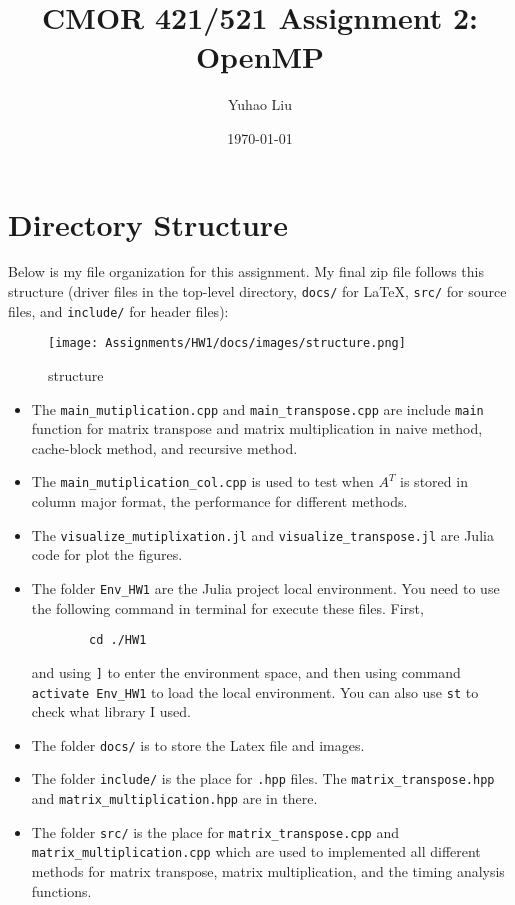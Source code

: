 \documentclass[11pt]{article}
\title{CMOR 421/521 Assignment 2: OpenMP}
\author{Yuhao Liu}
\date{\today}
\begin{document}
\maketitle

\tableofcontents
\bigskip

\newpage

\section{Directory Structure}
Below is my file organization for this assignment. 
My final zip file follows this structure (driver files in the top-level directory, 
\texttt{docs/} for LaTeX, \texttt{src/} for source files, and \texttt{include/} for header files):

\begin{figure}[H]
    \centering
    \texttt{[image: Assignments/HW1/docs/images/structure.png]}
    \caption{structure}
    \label{fig:structure}
\end{figure}

\begin{itemize}
    \item The \verb|main_mutiplication.cpp| and \verb|main_transpose.cpp| are include \verb|main| function for matrix transpose and matrix multiplication in naive method, cache-block method, and recursive method. 
    \item The \verb|main_mutiplication_col.cpp| is used to test when $A^T$ is stored in column major format, the performance for different methods.
    \item The \verb|visualize_mutiplixation.jl| and \verb|visualize_transpose.jl| are Julia code for plot the figures.
    \item The folder \verb|Env_HW1| are the Julia project local environment. You need to use the following command in terminal for execute these files. First,
    \begin{verbatim}
        cd ./HW1
    \end{verbatim}
    and using \verb|]| to enter the environment space, and then using command \verb|activate Env_HW1| to load the local environment. You can also use \verb|st| to check what library I used.
    \item The folder \texttt{docs/} is to store the Latex file and images.
    \item The folder \texttt{include/} is the place for \verb|.hpp| files. The \verb|matrix_transpose.hpp| and \verb|matrix_multiplication.hpp| are in there.
    \item The folder \texttt{src/} is the place for \verb|matrix_transpose.cpp| and \verb|matrix_multiplication.cpp| which are used to implemented all different methods for matrix transpose, matrix multiplication, and the timing analysis functions.

\end{itemize}
\end{document}
